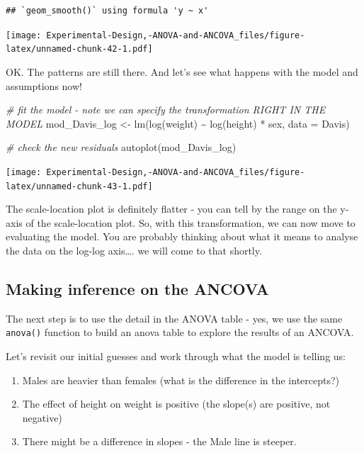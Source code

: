 \documentclass[
]{book}
\newenvironment{Shaded}{\begin{snugshade}}{\end{snugshade}}
\newcommand{\AttributeTok}[1]{\textcolor[rgb]{0.77,0.63,0.00}{#1}}
\newcommand{\CommentTok}[1]{\textcolor[rgb]{0.56,0.35,0.01}{\textit{#1}}}
\newcommand{\FunctionTok}[1]{\textcolor[rgb]{0.00,0.00,0.00}{#1}}
\newcommand{\NormalTok}[1]{#1}
\newcommand{\OtherTok}[1]{\textcolor[rgb]{0.56,0.35,0.01}{#1}}
\newcommand{\SpecialCharTok}[1]{\textcolor[rgb]{0.00,0.00,0.00}{#1}}
\providecommand{\tightlist}{%
  \setlength{\itemsep}{0pt}\setlength{\parskip}{0pt}}
\begin{document}
\begin{verbatim}
## `geom_smooth()` using formula 'y ~ x'
\end{verbatim}

\texttt{[image: Experimental-Design,-ANOVA-and-ANCOVA\_files/figure-latex/unnamed-chunk-42-1.pdf]}

OK. The patterns are still there. And let's see what happens with the model and assumptions now!

\begin{Shaded}
\begin{Highlighting}[]
\CommentTok{\# fit the model {-} note we can specify the transformation RIGHT IN THE MODEL}
\NormalTok{mod\_Davis\_log }\OtherTok{\textless{}{-}} \FunctionTok{lm}\NormalTok{(}\FunctionTok{log}\NormalTok{(weight) }\SpecialCharTok{\textasciitilde{}} \FunctionTok{log}\NormalTok{(height) }\SpecialCharTok{*}\NormalTok{ sex, }\AttributeTok{data =}\NormalTok{ Davis)}

\CommentTok{\# check the new residuals}
\FunctionTok{autoplot}\NormalTok{(mod\_Davis\_log)}
\end{Highlighting}
\end{Shaded}

\texttt{[image: Experimental-Design,-ANOVA-and-ANCOVA\_files/figure-latex/unnamed-chunk-43-1.pdf]}

The scale-location plot is definitely flatter - you can tell by the range on the y-axis of the scale-location plot. So, with this transformation, we can now move to evaluating the model. You are probably thinking about what it means to analyse the data on the log-log axis\ldots. we will come to that shortly.

\hypertarget{making-inference-on-the-ancova}{%
\subsection{Making inference on the ANCOVA}\label{making-inference-on-the-ancova}}

The next step is to use the detail in the ANOVA table - yes, we use the same \texttt{anova()} function to build an anova table to explore the results of an ANCOVA.

Let's revisit our initial guesses and work through what the model is telling us:

\begin{enumerate}
\def\labelenumi{\arabic{enumi}.}
\tightlist
\item
  Males are heavier than females (what is the difference in the intercepts?)
\item
  The effect of height on weight is positive (the slope(s) are positive, not negative)
\item
  There might be a difference in slopes - the Male line is steeper.
\end{enumerate}
\end{document}
